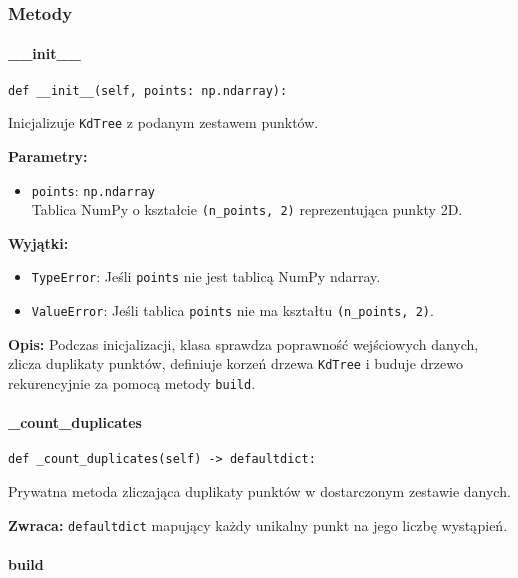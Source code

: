 \documentclass[12pt]{article}
\begin{document}
\subsubsection{Metody}

\paragraph{\_\_init\_\_}

\begin{verbatim}
def __init__(self, points: np.ndarray):
\end{verbatim}

\noindent Inicjalizuje \texttt{KdTree} z podanym zestawem punktów.

\noindent\textbf{Parametry:}
\begin{itemize}
    \item \texttt{points}: \texttt{np.ndarray} \\
    Tablica NumPy o kształcie \texttt{(n\_points, 2)} reprezentująca punkty 2D.
\end{itemize}

\noindent\textbf{Wyjątki:}
\begin{itemize}
    \item \texttt{TypeError}: Jeśli \texttt{points} nie jest tablicą NumPy ndarray.
    \item \texttt{ValueError}: Jeśli tablica \texttt{points} nie ma kształtu \texttt{(n\_points, 2)}.
\end{itemize}

\textbf{Opis:}
Podczas inicjalizacji, klasa sprawdza poprawność wejściowych danych, zlicza duplikaty punktów, definiuje korzeń drzewa \texttt{KdTree} i buduje drzewo rekurencyjnie za pomocą metody \texttt{build}.

\paragraph{\_count\_duplicates}

\begin{verbatim}
def _count_duplicates(self) -> defaultdict:
\end{verbatim}

\noindent Prywatna metoda zliczająca duplikaty punktów w dostarczonym zestawie danych.

\textbf{Zwraca:} 
\texttt{defaultdict} mapujący każdy unikalny punkt na jego liczbę wystąpień.

\paragraph{build}
\end{document}
